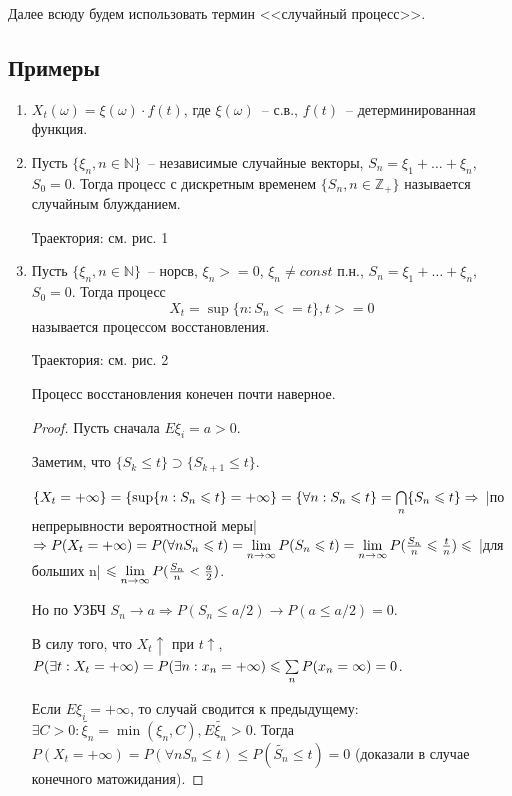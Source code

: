 \begin{remark}
Далее всюду будем использовать термин <<случайный процесс>>.
\end{remark}

\subsection{Примеры}
\begin{enumerate}
\item $X_t(\omega) = \xi(\omega) \cdot f(t)$, где $\xi(\omega)$~-- с.в., $f(t)$~-- детерминированная функция.
\item Пусть $\{\xi_n, n\in\mathbb{N}\}$~-- независимые случайные векторы, $S_n = \xi_1 + \dots + \xi_n$,
$S_0 = 0$. Тогда процесс с дискретным временем $\{S_n, n \in \mathbb{Z}_+\}$
называется случайным блужданием.

Траектория: см. рис. 1
\item Пусть $\{\xi_n, n \in \mathbb{N}\}$~-- норсв, $\xi_n >= 0$, $\xi_n \neq const$ п.н.,
$S_n = \xi_1 + \dots + \xi_n$, $S_0 = 0$. Тогда процесс
$$X_t = \sup\{n: S_n <= t\}, t >= 0$$
называется процессом восстановления.

Траектория: см. рис. 2

\begin{statement}
Процесс восстановления конечен почти наверное.
\end{statement}
\begin{proof}
Пусть сначала $E\xi_i = a > 0$.

Заметим, что $\{S_k \leq t\} \supset \{S_{k+1} \leq t\}$.

$\{X_t=+\infty\} = \{\sup\{n:S_n\leqslant t\} = +\infty\} =
\{\forall n: S_n \leqslant t\} = \bigcap\limits_n\{S_n \leqslant t\} \Rightarrow$
|по непрерывности вероятностной меры|
$\Rightarrow P(X_t = +\infty) = P(\forall n S_n \leqslant t) =
\lim\limits_{n \to \infty} P(S_n \leqslant t)
= \lim\limits_{n \to \infty} P(\frac{S_n}{n} \leqslant \frac{t}{n}) \leqslant$
|для больших n|
$\leqslant \lim\limits_{n \to \infty} P(\frac{S_n}{n} < \frac{a}{2})$.

Но по УЗБЧ $S_n \to a \Rightarrow P(S_n \leq a/2) \to P(a \leq a/2) = 0$.

В силу того, что $X_t\uparrow$ при $t\uparrow$,
$P(\exists t: X_t = +\infty) = P(\exists n: x_n = +\infty) \leqslant \sum\limits_{n}{P(x_n = \infty)} = 0$.

Если $E\xi_i = +\infty$, то случай сводится к предыдущему:
$\exists C > 0: \tilde{\xi_n} = \min(\xi_n, C), E\tilde{\xi_n} > 0$.
Тогда $P(X_t = +\infty) = P(\forall n S_n \leq t) \leq P(\tilde{S_n} \leq t) = 0$
(доказали в случае конечного матожидания).
\end{proof}


\end{enumerate}
